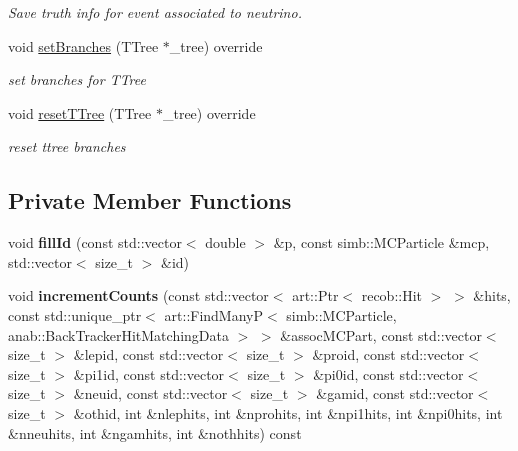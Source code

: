 \begin{DoxyCompactItemize}
\begin{DoxyCompactList}\small\item\em Save truth info for event associated to neutrino. \end{DoxyCompactList}\item 
void \hyperlink{classanalysis_1_1SlicePurCompl_ae7e1131785f819a530a573c6b20d1cbc}{set\+Branches} (T\+Tree $\ast$\+\_\+tree) override\hypertarget{classanalysis_1_1SlicePurCompl_ae7e1131785f819a530a573c6b20d1cbc}{}\label{classanalysis_1_1SlicePurCompl_ae7e1131785f819a530a573c6b20d1cbc}

\begin{DoxyCompactList}\small\item\em set branches for T\+Tree \end{DoxyCompactList}\item 
void \hyperlink{classanalysis_1_1SlicePurCompl_a43bf5b44e619f2dc3e5d00098048471b}{reset\+T\+Tree} (T\+Tree $\ast$\+\_\+tree) override\hypertarget{classanalysis_1_1SlicePurCompl_a43bf5b44e619f2dc3e5d00098048471b}{}\label{classanalysis_1_1SlicePurCompl_a43bf5b44e619f2dc3e5d00098048471b}

\begin{DoxyCompactList}\small\item\em reset ttree branches \end{DoxyCompactList}\end{DoxyCompactItemize}
\subsection*{Private Member Functions}
\begin{DoxyCompactItemize}
\item 
void {\bfseries fill\+Id} (const std\+::vector$<$ double $>$ \&p, const simb\+::\+M\+C\+Particle \&mcp, std\+::vector$<$ size\+\_\+t $>$ \&id)\hypertarget{classanalysis_1_1SlicePurCompl_a1cab4a3ebdd3aae05b22ad5d06a6ce1b}{}\label{classanalysis_1_1SlicePurCompl_a1cab4a3ebdd3aae05b22ad5d06a6ce1b}

\item 
void {\bfseries increment\+Counts} (const std\+::vector$<$ art\+::\+Ptr$<$ recob\+::\+Hit $>$ $>$ \&hits, const std\+::unique\+\_\+ptr$<$ art\+::\+Find\+ManyP$<$ simb\+::\+M\+C\+Particle, anab\+::\+Back\+Tracker\+Hit\+Matching\+Data $>$ $>$ \&assoc\+M\+C\+Part, const std\+::vector$<$ size\+\_\+t $>$ \&lepid, const std\+::vector$<$ size\+\_\+t $>$ \&proid, const std\+::vector$<$ size\+\_\+t $>$ \&pi1id, const std\+::vector$<$ size\+\_\+t $>$ \&pi0id, const std\+::vector$<$ size\+\_\+t $>$ \&neuid, const std\+::vector$<$ size\+\_\+t $>$ \&gamid, const std\+::vector$<$ size\+\_\+t $>$ \&othid, int \&nlephits, int \&nprohits, int \&npi1hits, int \&npi0hits, int \&nneuhits, int \&ngamhits, int \&nothhits) const \hypertarget{classanalysis_1_1SlicePurCompl_a3ae6a4a95f5d387edd47f3646bc39c70}{}\label{classanalysis_1_1SlicePurCompl_a3ae6a4a95f5d387edd47f3646bc39c70}

\end{DoxyCompactItemize}

